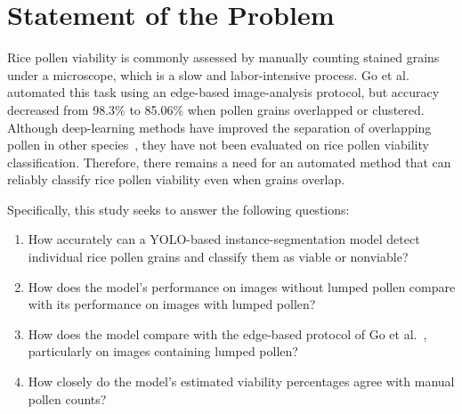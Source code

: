 \newpage
\section{Statement of the Problem}
\label{ch:problem-statement}

Rice pollen viability is commonly assessed by manually counting stained grains under a microscope, which is a slow and labor-intensive process. Go et al.~\cite{go2019} automated this task using an edge-based image-analysis protocol, but accuracy decreased from 98.3\% to 85.06\% when pollen grains overlapped or clustered. Although deep-learning methods have improved the separation of overlapping pollen in other species~\cite{zhang2023, tan2022, li2026pvdt}, they have not been evaluated on rice pollen viability classification. Therefore, there remains a need for an automated method that can reliably classify rice pollen viability even when grains overlap.

Specifically, this study seeks to answer the following questions:

\begin{enumerate}
    \item How accurately can a YOLO-based instance-segmentation model detect individual rice pollen grains and classify them as viable or nonviable?
    \item How does the model's performance on images without lumped pollen compare with its performance on images with lumped pollen?
    \item How does the model compare with the edge-based protocol of Go et al.~\cite{go2019}, particularly on images containing lumped pollen?
    \item How closely do the model's estimated viability percentages agree with manual pollen counts?
\end{enumerate}
